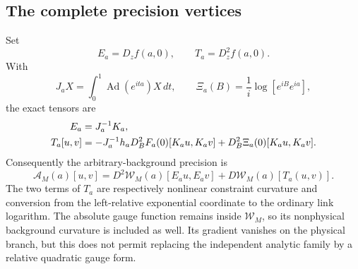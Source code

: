 \documentclass[11pt]{article}
\theoremstyle{remark}
\begin{document}
\subsection{The complete precision vertices}
\label{dmt-precision-vertices-section}

Set
\begin{equation}
 E_a=D_zf(a,0),\qquad T_a=D_z^2f(a,0).
 \label{dmt-chart-tensors}
\end{equation}
With
\[
 J_aX=\int_0^1\operatorname{Ad}(e^{ita})X\,dt,\qquad
 \Xi_a(B)=\frac1i\log[e^{iB}e^{ia}],
\]
the exact tensors are
\begin{align}
 E_a&=J_a^{-1}K_a,\notag\\
 T_a[u,v]&=-J_a^{-1}h_aD_B^2F_a(0)[K_au,K_av]
       +D_B^2\Xi_a(0)[K_au,K_av].
 \label{dmt-both-chart-curvatures}
\end{align}
Consequently the arbitrary-background precision is
\begin{equation}
 \mathscr A_M(a)[u,v]
       =D^2\mathcal W_M(a)[E_au,E_av]
                  +D\mathcal W_M(a)[T_a(u,v)].
 \label{dmt-complete-precision}
\end{equation}
The two terms of \(T_a\) are respectively nonlinear constraint
curvature and conversion from the left-relative exponential
coordinate to the ordinary link logarithm. The absolute gauge
function remains inside \(\mathcal W_M\), so its nonphysical
background curvature is included as well. Its gradient
vanishes on the physical branch, but this does not permit
replacing the independent analytic family by a relative
quadratic gauge form.
\end{document}
